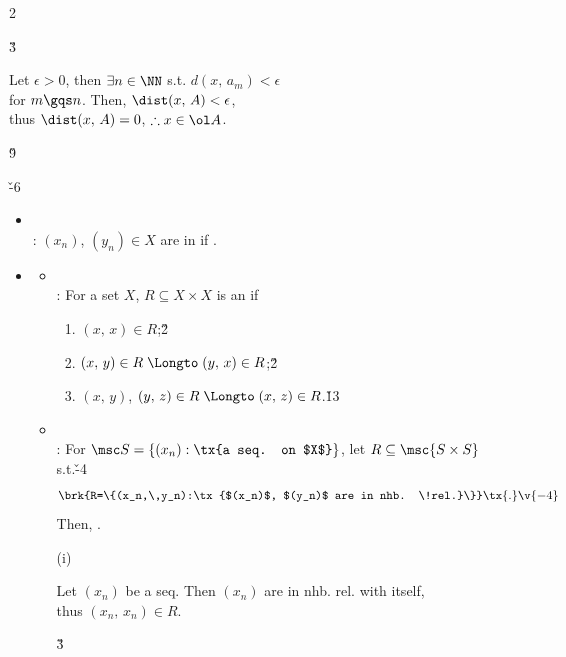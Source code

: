 \documentclass[dvipdfmx,a4paper,titlepage,9pt]{jsarticle}
\begin{document}
\begin{multicols*}{2}
\begin{itemize}[label=-]
\begin{itemize}[label=\Cdot]
\begin{Pfbox}
\dotfill\v3

\ti{[$\Longfrom$]} Let $\epsilon>0$, then $\exists n\in\NN$ s.t. $d(x,\,a_m)<\epsilon$ \\
for $m\gqs n$. Then, $\dist(x,\,A)<\epsilon$, \\
thus $\dist(x,\,A)=0$, \;$\therefore x\in\ol A$.
\end{Pfbox} \v9
\end{itemize}
\end{itemize}

\v{-6}
\begin{itemize}[label=-]
\item{}\\
: $(x_n)$, $(y_n)\in X$ are in  if .\\

\item{}
\begin{itemize}[label=\Cdot]
\setlength{\leftskip}{-10pt}
\item{}\\
: For a set $X$, $R\subseteq X\times X$ is an  if
\begin{enumerate}[label=(\roman*)]
\setlength{\leftskip}{-15pt}
\item $(x,\,x)\in R$;\hfill{}\v2
\item $(x,\,y)\in R\;\Longto\;(y,\,x)\in R$;\hfill\ti{\Gray[Symmetric Cd.]}\v2
\item $(x,\,y)$, $(y,\,z)\in R\;\Longto\;(x,\,z)\in R$.\!\!\hfill\ti{\Gray[Transitive Cd.]}\v{13}
\end{enumerate}

\item{}\\
: For $\msc S=\{(x_n):\tx{a seq. on $X$}\}$, let $R\subseteq \msc{S\times S}$ s.t.\v{-4}
$$\brk{R=\{(x_n,\,y_n):\tx{$(x_n)$, $(y_n)$ are in nhb. \!rel.}\}}\tx{.}\v{-4}$$
Then, .

\newpage

\begin{Pfbox}
(i) 

Let $(x_n)$ be a seq. Then $(x_n)$ are in nhb. rel. with itself, \\
thus $(x_n,\,x_n)\in R$.\hfill\Sq

\dotfill\v3


\end{Pfbox}
\end{itemize}
\end{itemize}
\end{multicols*}
\end{document}

